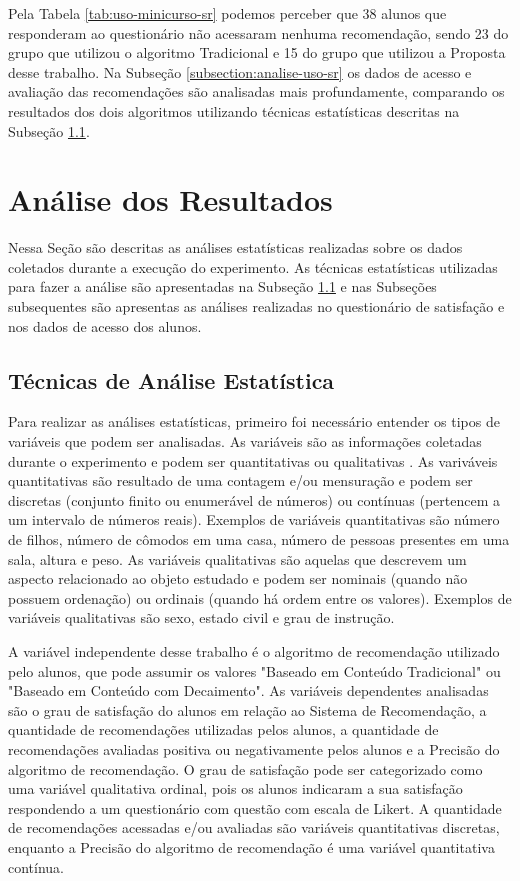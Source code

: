Pela Tabela \ref{tab:uso-minicurso-sr} podemos perceber que 38 alunos que responderam ao questionário não acessaram nenhuma
recomendação, sendo 23 do grupo que utilizou o algoritmo Tradicional e 15 do grupo que utilizou a Proposta desse
trabalho. Na Subseção \ref{subsection:analise-uso-sr} os dados de acesso e avaliação das recomendações são analisadas mais profundamente,
comparando os resultados dos dois algoritmos utilizando técnicas estatísticas descritas na Subseção \ref{section:tecnicas-analise-estatistica}.

\section{Análise dos Resultados}\label{section:analise-experimento}

Nessa Seção são descritas as análises estatísticas realizadas sobre os dados coletados durante a execução do experimento.
As técnicas estatísticas utilizadas para fazer a análise são apresentadas na Subseção \ref{section:tecnicas-analise-estatistica}
e nas Subseções subsequentes são apresentas as análises realizadas no questionário de satisfação e nos dados de acesso
dos alunos.

\subsection{Técnicas de Análise Estatística}\label{section:tecnicas-analise-estatistica}

Para realizar as análises estatísticas, primeiro foi necessário entender os tipos de variáveis que podem ser analisadas.
As variáveis são as informações coletadas durante o experimento e podem ser quantitativas ou qualitativas \cite{bussab2012morettin}.
As variváveis quantitativas são resultado de uma contagem e/ou mensuração \cite{bussab2012morettin} e podem ser discretas
(conjunto finito ou enumerável de números) ou contínuas (pertencem a um intervalo de números reais). Exemplos de variáveis
quantitativas são número de filhos, número de cômodos em uma casa, número de pessoas presentes em uma sala, altura e peso.
As variáveis qualitativas são aquelas que descrevem um aspecto relacionado ao objeto estudado \cite{bussab2012morettin} e podem ser
nominais (quando não possuem ordenação) ou ordinais (quando há ordem entre os valores). Exemplos de variáveis qualitativas
são sexo, estado civil e grau de instrução.

A variável independente desse trabalho é o algoritmo de recomendação utilizado pelo alunos, que pode assumir os valores
"Baseado em Conteúdo Tradicional" ou "Baseado em Conteúdo com Decaimento". As variáveis dependentes analisadas são o grau de
satisfação do alunos em relação ao Sistema de Recomendação, a quantidade de recomendações utilizadas pelos alunos, a quantidade de recomendações
avaliadas positiva ou negativamente pelos alunos e a Precisão do algoritmo de recomendação. O grau de satisfação pode ser
categorizado como uma variável qualitativa ordinal, pois os alunos indicaram a sua satisfação respondendo a um questionário
com questão com escala de Likert. A quantidade de recomendações acessadas e/ou avaliadas são variáveis quantitativas discretas,
enquanto a Precisão do algoritmo de recomendação é uma variável quantitativa contínua.

